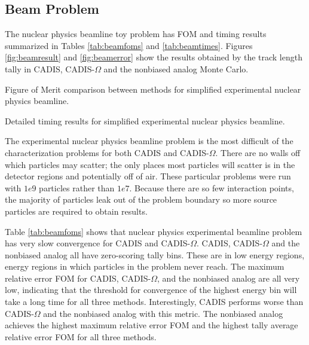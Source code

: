 \subsection{Beam Problem}
\label{subsec:resultsbeam}

The nuclear physics beamline toy problem has FOM and timing
results summarized in Tables
\ref{tab:beamfoms} and \ref{tab:beamtimes}. Figures
\ref{fig:beamresult} and \ref{fig:beamerror} show the results obtained
by the track length tally in CADIS, CADIS-$\Omega$ and the nonbiased analog
Monte Carlo.

\begin{table}[h!]
  \centering
  
  \caption[Figure of Merit comparison between methods for simplified
    experimental nuclear physics beamline.]
    {Figure of Merit comparison between methods for simplified experimental
    nuclear physics beamline.}
  \label{tab:beamfoms}
\end{table}

\begin{table}[h!]
  \centering
  
  \caption[Detailed timing results for simplified experimental nuclear physics
  beamline.]
  {Detailed timing results for simplified experimental nuclear physics beamline.}
  \label{tab:beamtimes}
\end{table}

The experimental nuclear physics beamline problem is the most
difficult of the characterization problems for both CADIS and CADIS-$\Omega$.
There are no walls off which
particles may scatter; the only places most particles will scatter is in the
detector regions and potentially off of air. These particular problems were run
with $1e9$ particles rather than $1e7$. Because there are so few interaction
points, the majority of particles leak out of the problem boundary so
more source particles are required to obtain results.

Table \ref{tab:beamfoms} shows that nuclear physics experimental beamline
problem has very slow convergence for
CADIS and CADIS-$\Omega$. CADIS, CADIS-$\Omega$ and the nonbiased analog all have
zero-scoring tally bins. These are in low energy regions, energy regions in
which particles in the problem never reach.
The maximum relative error FOM for CADIS, CADIS-$\Omega$,
and the nonbiased analog are all very low, indicating that the threshold for
convergence of the highest energy bin will take a long time for all three
methods. Interestingly, CADIS performs worse than CADIS-$\Omega$ and the
nonbiased analog with this metric. The nonbiased analog achieves the highest
maximum relative error FOM and the highest tally average relative error FOM for all
three methods.

